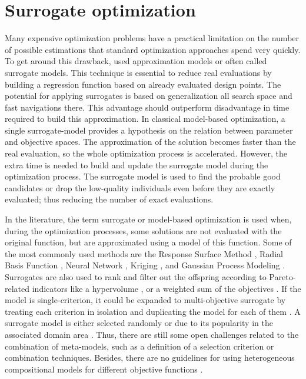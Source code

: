     \section{Surrogate optimization} 
        Many expensive optimization problems have a practical limitation on the number of possible estimations that standard optimization approaches spend very quickly. To get around this drawback, used approximation models or often called surrogate models. This technique is essential to reduce real evaluations by building a regression function based on already evaluated design points.
        The potential for applying surrogates is based on generalization all search space and fast navigations there. This advantage should outperform disadvantage in time required to build this approximation. In classical model-based optimization, a single surrogate-model provides a hypothesis on the relation between parameter and objective spaces. The approximation of the solution becomes faster than the real evaluation, so the whole optimization process is accelerated. However, the extra time is needed to build and update the surrogate model during the optimization process. The surrogate model is used to find the probable good candidates or drop the low-quality individuals even before they are exactly evaluated; thus reducing the number of exact evaluations.

        In the literature, the term surrogate or model-based optimization is used when, during the optimization processes, some solutions are not evaluated with the original function, but are approximated using a model of this function. Some of the most commonly used methods are the Response Surface Method \cite{ResponseSurface}, Radial Basis Function \cite{Rasmussen2004}, Neural Network \cite{KOURAKOS201313}, Kriging \cite{Woodard00}, and Gaussian Process Modeling \cite{RasmussenN10, RasmussenW06}. Surrogates are also used to rank and filter out the offspring according to Pareto-related indicators like a hypervolume \cite{EmmerichGN06}, or a weighted sum of the objectives \cite{TaboadaBCW07}. If the model is single-criterion, it could be expanded to multi-objective surrogate by treating each criterion in isolation and duplicating the model for each of them \cite{Knowles06, nardi2019practical}. A surrogate model is either selected randomly or due to its popularity in the associated domain area \cite{SoftSurvey}. Thus, there are still some open challenges related to the combination of meta-models, such as a definition of a selection criterion or combination techniques. Besides, there are no guidelines for using heterogeneous compositional models for different objective functions \cite{SoftSurvey}.

